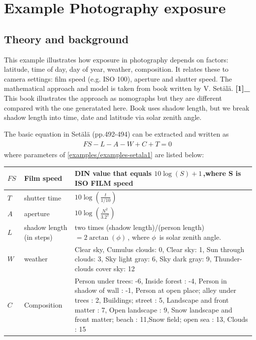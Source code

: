 \documentclass[a4paper,11pt,english]{sphinxmanual}
\begin{document}
\section{Example Photography exposure}
\label{examples/examples:example-photography-exposure}

\subsection{Theory and background}
\label{examples/examples:id7}
This example illustrates how exposure in photography depends on factors:
latitude, time of day, day of year, weather, composition. It relates
these to camera settings: film speed (e.g. ISO 100), aperture and
shutter speed. The mathematical approach and model is taken from book
written by V. Setälä. {\color{red}\bfseries{}{[}1{]}\_} This book illustrates the approach as
nomographs but they are different compared with the one generatated
here. Book uses shadow length, but we break shadow length into time,
date and latitude via solar zenith angle.

The basic equation in Setälä (pp.492-494) can be extracted and
written as
\label{examples/examples:equation-setala1}\begin{gather}
\begin{split}FS-L-A-W+C+T=0 \,\end{split}\label{examples/examples-setala1}
\end{gather}
where parameters of \eqref{examples/examples-setala1} are listed below:

\begin{tabulary}{\linewidth}{|L|L|L|}
\hline

\(FS\,\)
 & 
Film speed
 & 
DIN value that equals \(10 \log (S) +1 \,\),where S is ISO FILM speed
\\
\hline
\(T\,\)
 & 
shutter time
 & 
\(10 \log \left( \frac{t}{1/10}\right)\)
\\
\hline
\(A\,\)
 & 
aperture
 & 
\(10 \log \left(\frac{N^2}{3.2^2}\right)\)
\\
\hline
\(L\,\)
 & 
shadow length (in steps)
 & 
two times (shadow length)/(person length) \(= 2 \arctan ( \phi) \,\), where \(\phi \,\) is solar zenith angle.
\\
\hline
\(W\,\)
 & 
weather
 & 
Clear sky, Cumulus clouds: 0, Clear sky: 1, Sun through clouds: 3, Sky light gray: 6, Sky dark gray: 9, Thunder-clouds cover sky: 12
\\
\hline
\(C\,\)
 & 
Composition
 & 
Person under trees: -6, Inside forest : -4, Person in shadow of wall : -1, Person at open place; alley under trees : 2, Buildings; street : 5, Landscape and front matter : 7, Open landscape : 9, Snow landscape and front matter; beach : 11,Snow field; open sea : 13, Clouds : 15
\\
\hline\end{tabulary}
\end{document}
